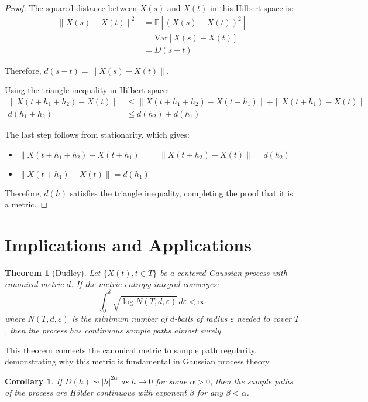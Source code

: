 \documentclass{article}
\theoremstyle{plain}
\newtheorem{theorem}{Theorem}
\newtheorem{corollary}{Corollary}
\theoremstyle{definition}
\begin{document}
\begin{proof}
The squared distance between $X(s)$ and $X(t)$ in this Hilbert space is:
\begin{align}
\|X(s) - X(t)\|^2 &= \mathbb{E}[(X(s) - X(t))^2] \\
&= \text{Var}[X(s) - X(t)] \\
&= D(s-t)
\end{align}

Therefore, $d(s-t) = \|X(s) - X(t)\|$.

Using the triangle inequality in Hilbert space:
\begin{align}
\|X(t+h_1+h_2) - X(t)\| &\leq \|X(t+h_1+h_2) - X(t+h_1)\| + \|X(t+h_1) - X(t)\| \\
d(h_1+h_2) &\leq d(h_2) + d(h_1)
\end{align}

The last step follows from stationarity, which gives:
\begin{itemize}
    \item $\|X(t+h_1+h_2) - X(t+h_1)\| = \|X(t+h_2) - X(t)\| = d(h_2)$
    \item $\|X(t+h_1) - X(t)\| = d(h_1)$
\end{itemize}

Therefore, $d(h)$ satisfies the triangle inequality, completing the proof that it is a metric.
\end{proof}

\section{Implications and Applications}

\begin{theorem}[Dudley]
Let $\{X(t), t \in T\}$ be a centered Gaussian process with canonical metric $d$. If the metric entropy integral converges:
\begin{equation}
\int_0^{\delta} \sqrt{\log N(T, d, \varepsilon)} \, d\varepsilon < \infty
\end{equation}
where $N(T, d, \varepsilon)$ is the minimum number of $d$-balls of radius $\varepsilon$ needed to cover $T$, then the process has continuous sample paths almost surely.
\end{theorem}

This theorem connects the canonical metric to sample path regularity, demonstrating why this metric is fundamental in Gaussian process theory.

\begin{corollary}
If $D(h) \sim |h|^{2\alpha}$ as $h \to 0$ for some $\alpha > 0$, then the sample paths of the process are Hölder continuous with exponent $\beta$ for any $\beta < \alpha$.
\end{corollary}
\end{document}
